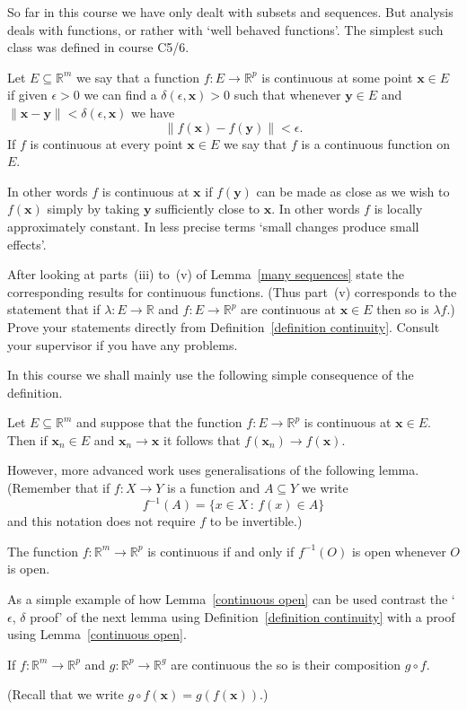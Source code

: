 So far in this course we have only dealt with
subsets and sequences. But analysis deals
with functions, or rather with `well behaved
functions'. The simplest such class was defined
in course C5/6.
\begin{definition}\label{definition continuity}
Let $E\subseteq{\mathbb R}^{m}$
we say that a function $f:E\rightarrow{\mathbb R}^{p}$
is continuous at some point ${\mathbf x}\in E$
if given $\epsilon>0$ we can find a 
$\delta(\epsilon,{\mathbf x})>0$ such that
whenever ${\mathbf y}\in E$ and
$\|{\mathbf x}-{\mathbf y}\|<\delta(\epsilon,{\mathbf x})$
we have 
\[\|f({\mathbf x})-f({\mathbf y})\|<\epsilon.\]
If $f$ is continuous at every point ${\mathbf x}\in E$
we say that $f$ is a continuous function on $E$.
\end{definition}
In other words $f$ is continuous at ${\mathbf x}$ if
$f({\mathbf y})$ can be made as close as we wish
to $f({\mathbf x})$ simply by taking ${\mathbf y}$ sufficiently
close to ${\mathbf x}$. In other words
$f$ is locally approximately constant. In less precise
terms `small changes produce small effects'.

\begin{exercise}\label{art of continuity} 
After looking at parts~(iii) to~(v)
of Lemma~\ref{many sequences} state the corresponding
results for continuous functions. (Thus part~(v) 
corresponds to the statement that if 
$\lambda:E\rightarrow{\mathbb R}$ and 
$f:E\rightarrow{\mathbb R}^{p}$ are continuous
at ${\mathbf x}\in E$ then so is $\lambda f$.)
Prove your statements directly from 
Definition~\ref{definition continuity}.
Consult your supervisor if you have any problems.
\end{exercise}

In this course we shall mainly use the following
simple consequence of the definition.
\begin{lemma} Let $E\subseteq{\mathbb R}^{m}$
and suppose that the function $f:E\rightarrow{\mathbb R}^{p}$
is continuous at ${\mathbf x}\in E$. Then if 
${\mathbf x}_{n}\in E$ and ${\mathbf x}_{n}\rightarrow{\mathbf x}$
it follows that $f({\mathbf x}_{n})\rightarrow f({\mathbf x})$.
\end{lemma}

However, more advanced work uses generalisations of the
following lemma. (Remember that if $f:X\rightarrow Y$ is a function
and $A\subseteq Y$
we write
\[f^{-1}(A)=\{x\in X\, :\, f(x)\in A\}\]
and this notation does not require $f$ to be invertible.)
\begin{lemma}\label{continuous open}
The function 
$f:{\mathbb R}^{m}\rightarrow {\mathbb R}^{p}$
is continuous if and only if $f^{-1}(O)$ is open
whenever $O$ is open.
\end{lemma}
As a simple example of how Lemma~\ref{continuous open}
can be used contrast the `$\epsilon$, $\delta$ proof'
of the next lemma
using Definition~\ref{definition continuity} with
a proof using  Lemma~\ref{continuous open}.
\begin{lemma}\label{composition} 
If $f:{\mathbb R}^{m}\rightarrow {\mathbb R}^{p}$
and $g:{\mathbb R}^{p}\rightarrow {\mathbb R}^{g}$
are continuous the so is their composition 
$g\circ f$.
\end{lemma}
(Recall that we write $g\circ f({\mathbf x})=g(f({\mathbf x}))$.)

